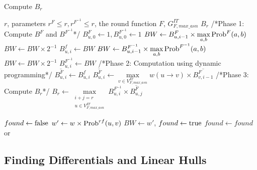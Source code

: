 \begin{algorithm}
	\caption{Compute $B_r$}
	\label{algo1}
	\begin{algorithmic}[1] %
		\Require $r$, parameters $r^F\leq r,r^{F^{-1}}\leq r$, the round function $F$, $G^{IT}_{F,max\_asn}$
		\Ensure $B_r$
		\State /*Phase 1: Compute $B^F$ and $B^{F^{-1}}$*/
		\State $B^F_{u,0}\leftarrow 1,B^{F^{-1}}_{u,0}\leftarrow 1$
		\EndFor
		\State $BW\leftarrow B^F_{u,i-1}\times\max\limits_{a,b} \text{Prob}^F(a,b)$
		\State $BW\leftarrow BW\times 2^{-1}$
		\EndWhile
		\State $B^f_{u,i}\leftarrow BW$
		\EndFor
		\State $BW\leftarrow B^{F^{-1}}_{u,i-1}\times\max\limits_{a,b} \text{Prob}^{F^{-1}}(a,b)$
		\State $BW\leftarrow BW\times 2^{-1}$
		\EndWhile
		\State $B^{F^{-1}}_{u,i}\leftarrow BW$
		\EndFor
		\State /*Phase 2: Computation using dynamic programming*/
		\State $\overline{B^F_{u,i}}\leftarrow B^f_{u,i}$
		\EndFor
		\State $\overline{B^F_{u,i}}\leftarrow\max\limits_{v\in V^{IT}_{F,max\_asn}} w(u\rightarrow v)\times\overline{B^F_{v,i-1}}$
		\EndFor
		\State /*Phase 3: Compute $B_r$*/
		\State $B_r\leftarrow\max\limits_{\substack{i+j=r\\u\in V^{IT}_{F,max\_asn}}} B^{F^{-1}}_{u,i}\times \overline{B^F_{u,j}}$
		\EndProcedure
		
		\State $found\leftarrow\text{false}$
		\State $w'\leftarrow w\times \text{Prob}^{rf}(u,v)$
		\State$BW\leftarrow w'$, $found\leftarrow \text{true}$
		\EndIf
		\Else
		\State $found\leftarrow found$ or 
		\EndIf
		\EndFor
		\State {}
		\EndFunction
	\end{algorithmic}
\end{algorithm}

\subsection{Finding Differentials and Linear Hulls\label{subsec:find-clusters}}

